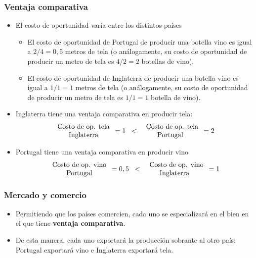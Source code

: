 \documentclass{beamer}
\begin{document}
\begin{frame}
\frametitle{Ventaja comparativa}
\begin{itemize}
    \item El costo de oportunidad varía entre los distintos países\vspace{2mm}
        \begin{itemize}
        \item El costo de oportunidad de Portugal de producir una botella vino es igual a $2/4 =0,5$ metros de tela (o análogamente, su costo de oportunidad de producir un metro de tela es $4/2 =2$ botellas de vino).        \vspace{2mm}
        \item El costo de oportunidad de Inglaterra de producir una botella vino es igual a $1/1 =1$ metros de tela (o análogamente, su costo de oportunidad de producir un metro de tela es $1/1 =1$ botella de vino). 
        \end{itemize}
    \item Inglaterra tiene una ventaja comparativa en producir tela:
     \[ \begin{array}{c}
    \text{Costo de op. tela} \\ \text{Inglaterra}
    \end{array}= 1 \hspace{2mm} < \begin{array}{c}
    \hspace{2mm} \text{Costo de op. tela} \\ \text{Portugal}
    \end{array} = 2\] 
    \item Portugal tiene una ventaja comparativa en producir vino 
     \[ \begin{array}{c}
    \text{Costo de op. vino} \\ \text{Portugal}
    \end{array}= 0,5 \hspace{2mm} < \begin{array}{c}
    \hspace{2mm} \text{Costo de op. vino} \\ \text{Inglaterra}
    \end{array} = 1\] 
\end{itemize}
\end{frame}

\begin{frame}
\frametitle{Mercado y comercio}
\begin{itemize}
    \item Permitiendo que los países comercien, cada uno se especializará en el bien en el que tiene \textbf{ventaja comparativa}. \vspace{4mm}
    \item De esta manera, cada uno exportará la producción sobrante al otro país: Portugal exportará vino e Inglaterra exportará tela. 
\end{itemize}
\end{frame}
\end{document}
